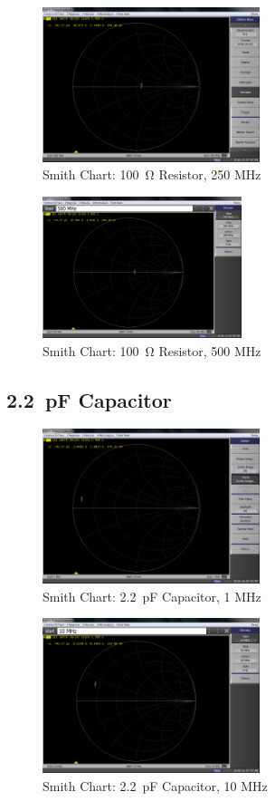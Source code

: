 \documentclass[conference]{IEEEtran}
\begin{document}
\begin{figure}[H]
  \centering
  \includegraphics[width=2.5in]{./img/smith_100_ohms_250_MHz.png}
  \caption{Smith Chart: \SI{100}{\ohm} Resistor, 250 MHz}
  \label{fig:smith_100_ohms_250_MHz}
\end{figure}

\begin{figure}[H]
  \centering
  \includegraphics[width=2.29in]{./img/smith_100_ohms_500_MHz.png}
  \caption{Smith Chart: \SI{100}{\ohm} Resistor, 500 MHz}
  \label{fig:smith_100_ohms_500_MHz}
\end{figure}

\subsection{\SI{2.2}{\pico\farad} Capacitor}

\begin{figure}[H]
  \centering
  \includegraphics[width=2.5in]{./img/smith_2_pF_1_MHz.png}
  \caption{Smith Chart: \SI{2.2}{\pico\farad} Capacitor, 1 MHz}
  \label{fig:smith_2_pF_1_MHz}
\end{figure}

\begin{figure}[H]
  \centering
  \includegraphics[width=2.5in]{./img/smith_2_pF_10_MHz.png}
  \caption{Smith Chart: \SI{2.2}{\pico\farad} Capacitor, 10 MHz}
  \label{fig:smith_2_pF_10_MHz}
\end{figure}
\end{document}
